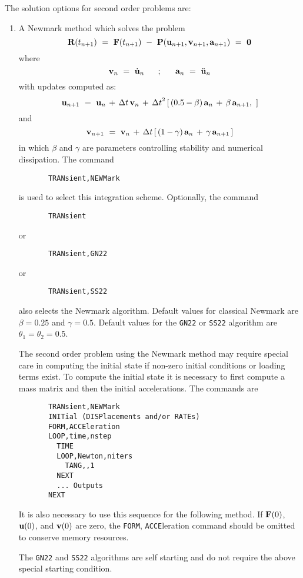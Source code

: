 The solution options for second order problems are:

\begin{enumerate}
\item
{A Newmark method which solves the problem
\begin{equation}
\mathbf{R} (t_{n+1}) ~=~ \mathbf{F}(t_{n+1})
~-~ \mathbf{P}( \mathbf{u}_{n+1} , \mathbf{v}_{n+1} , \mathbf{a}_{n+1}) ~=~ {\bf 0}
\end{equation}
where
\begin{equation}
\mathbf{v}_n ~=~ \dot{\mathbf{u}}_n ~~~~~;~~~~~ \mathbf{a}_n ~=~ \ddot{\mathbf{u}}_n
\end{equation}
with updates computed as:
\begin{equation}
\mathbf{u}_{n+1} ~=~ \mathbf{u}_n \,+\, {\Delta t} \, \mathbf{v}_n \,+\,
{\Delta t}^2 \, [ \, (0.5 - \beta ) \, \mathbf{a}_n
\,+\, \beta \, \mathbf{a}_{n+1} ,\ ]
\end{equation}
and
\begin{equation}
\mathbf{v}_{n+1} ~=~ \mathbf{v}_n \,+\, {\Delta t} \,[\, (1 - \gamma) \, \mathbf{a}_n
\,+\, \gamma \, \mathbf{a}_{n+1} \, ]
\end{equation}
in which $\beta$ and $\gamma$ are parameters controlling stability and
numerical dissipation.  The command
\begin{verbatim}
       TRANsient,NEWMark
\end{verbatim}
is used to select this integration scheme.  Optionally, the command
\begin{verbatim}
       TRANsient
\end{verbatim}
or
\begin{verbatim}
       TRANsient,GN22
\end{verbatim}
or
\begin{verbatim}
       TRANsient,SS22
\end{verbatim}
also selects the Newmark algorithm.
Default values for classical Newmark are $\beta = 0.25$ and $\gamma = 0.5$.  
Default values for the \texttt{GN22} or \texttt{SS22} algorithm
are $\theta_1 = \theta_2 = 0.5$.

The second order problem using the Newmark method may require special
care in computing the initial state if non-zero initial conditions
or loading terms exist.  To compute the initial state it is necessary to
first compute a mass matrix and then the initial accelerations.  The
commands are
\begin{verbatim}
       TRANsient,NEWMark
       INITial (DISPlacements and/or RATEs)
       FORM,ACCEleration
       LOOP,time,nstep
         TIME
         LOOP,Newton,niters
           TANG,,1
         NEXT
         ... Outputs
       NEXT
\end{verbatim}
It is also necessary to use this sequence for the following method.
If $\mathbf{F} (0)$, $\mathbf{u} (0)$, and $\mathbf{v} (0)$ are zero, the
{\tt FORM}, {\tt ACCE}leration command should be omitted to conserve
memory resources.}  The \texttt{GN22} and \texttt{SS22} algorithms
are self starting and do not require the above special starting condition.


\end{enumerate}
